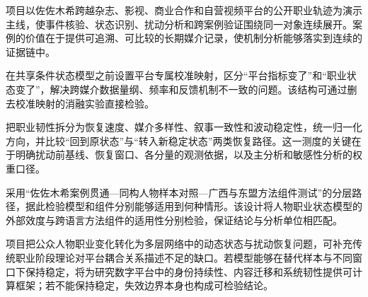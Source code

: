 \GXNSFBodyText


项目以佐佐木希跨越杂志、影视、商业合作和自营视频平台的公开职业轨迹为演示主线，使事件核验、状态识别、扰动分析和跨案例验证围绕同一对象连续展开。案例的价值在于提供可追溯、可比较的长期媒介记录，使机制分析能够落实到连续的证据链中。


在共享条件状态模型之前设置平台专属校准映射，区分“平台指标变了”和“职业状态变了”，解决跨媒介数据量纲、频率和反馈机制不一致的问题。该结构可通过删去校准映射的消融实验直接检验。

把职业韧性拆分为恢复速度、媒介多样性、叙事一致性和波动稳定性，统一归一化方向，并比较“回到原状态”与“转入新稳定状态”两类恢复路径。这一测度的关键在于明确扰动前基线、恢复窗口、各分量的观测依据，以及主分析和敏感性分析的权重口径。

采用“佐佐木希案例贯通—同构人物样本对照—广西与东盟方法组件测试”的分层路径，据此检验模型和组件分别能够适用到何种情形。该设计将人物职业状态模型的外部效度与跨语言方法组件的适用性分别检验，保证结论与分析单位相匹配。


项目把公众人物职业变化转化为多层网络中的动态状态与扰动恢复问题，可补充传统职业阶段理论对平台耦合关系描述不足的缺口。若模型能够在替代样本与不同窗口下保持稳定，将为研究数字平台中的身份持续性、内容迁移和系统韧性提供可计算框架；若不能保持稳定，失效边界本身也构成可检验结论。
